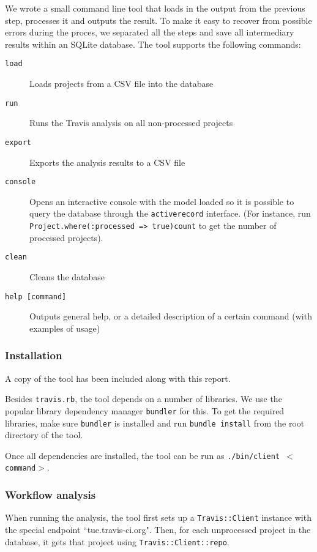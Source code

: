 We wrote a small command line tool that loads in the output from the previous step, processes it and outputs the result.
To make it easy to recover from possible errors during the proces, we separated all the steps and save all intermediary results within an SQLite database.
The tool supports the following commands:

\begin{description}
	\item[\texttt{load}] Loads projects from a CSV file into the database
	\item[\texttt{run}] Runs the Travis analysis on all non-processed projects
	\item[\texttt{export}] Exports the analysis results to a CSV file
	\item[\texttt{console}] Opens an interactive console with the model loaded so it is possible to query the database through the \texttt{activerecord} interface. (For instance, run \texttt{Project.\-where(:processed => true)\-count} to get the number of processed projects).
	\item[\texttt{clean}] Cleans the database
	\item[\texttt{help [command]}] Outputs general help, or a detailed description of a certain command (with examples of usage)
\end{description}

	\subsubsection{Installation}
	A copy of the tool has been included along with this report.
	
	Besides \texttt{travis.rb}, the tool depends on a number of libraries.
	We use the popular library dependency manager \texttt{bundler} for this.
	To get the required libraries, make sure \texttt{bundler} is installed and run \texttt{bundle install} from the root directory of the tool.
	
	Once all dependencies are installed, the tool can be run as \texttt{./bin/client $<$command$>$}.

	\subsubsection{Workflow analysis}
	When running the analysis, the tool first sets up a \texttt{Travis::Client} instance with the special endpoint ``tue.travis-ci.org".
	Then, for each unprocessed project in the database, it gets that project using \texttt{Travis::Client::repo}.
	
